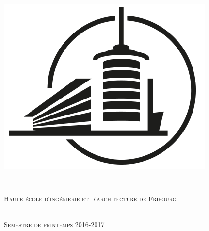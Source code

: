 \documentclass[a4paper, 12pt]{article}
\begin{document}
\begin{titlepage}
\newcommand{\HRule}{\rule{\linewidth}{0.5mm}} %
\center %
\begin{minipage}{0.2\textwidth}
\begin{center} \large
  \includegraphics{includes/images/logo_heia.png}\\[0.8cm] %
\end{center}
\end{minipage}
~
\begin{minipage}{0.75\textwidth}
\begin{center} \large
  \begin{doublespacing}
  \textsc{\LARGE Haute école d'ingénierie et d'architecture de Fribourg}\\[1cm] %
  \end{doublespacing}
\end{center}
\end{minipage}\\[1cm]
\textsc{\Large Semestre de printemps 2016-2017}\\[0.5cm] %

\end{titlepage}
\end{document}
